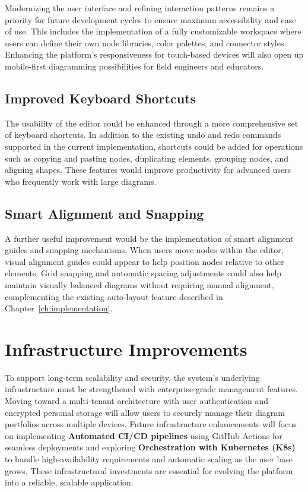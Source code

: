 Modernizing the user interface and refining interaction patterns 
remains a priority for future development cycles to ensure 
maximum accessibility and ease of use. This includes the 
implementation of a fully customizable workspace where users can 
define their own node libraries, color palettes, and connector 
styles. Enhancing the platform's responsiveness for touch-based 
devices will also open up mobile-first diagramming possibilities 
for field engineers and educators.

\subsection{Improved Keyboard Shortcuts}
\label{subsec:keyboard-shortcuts}

The usability of the editor could be enhanced through a more 
comprehensive set of keyboard shortcuts. In addition to the 
existing undo and redo commands supported in the current 
implementation, shortcuts could be added for operations such 
as copying and pasting nodes, duplicating elements, grouping 
nodes, and aligning shapes. These features would improve 
productivity for advanced users who frequently work with large 
diagrams.

\subsection{Smart Alignment and Snapping}
\label{subsec:smart-alignment}

A further useful improvement would be the implementation of 
smart alignment guides and snapping mechanisms. When users move 
nodes within the editor, visual alignment guides could appear 
to help position nodes relative to other elements. Grid 
snapping and automatic spacing adjustments could also help 
maintain visually balanced diagrams without requiring manual 
alignment, complementing the existing auto-layout feature 
described in Chapter~\ref{ch:implementation}.

\section{Infrastructure Improvements}
\label{sec:infrastructure}

To support long-term scalability and security, the system's 
underlying infrastructure must be strengthened with 
enterprise-grade management features. Moving toward a 
multi-tenant architecture with user authentication and 
encrypted personal storage will allow users to securely manage 
their diagram portfolios across multiple devices. Future 
infrastructure enhancements will focus on implementing 
\textbf{Automated CI/CD pipelines} using GitHub Actions for 
seamless deployments and exploring \textbf{Orchestration with 
Kubernetes (K8s)} to handle high-availability requirements and 
automatic scaling as the user base grows. These infrastructural 
investments are essential for evolving the platform into a 
reliable, scalable application.

